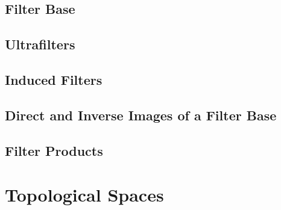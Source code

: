 \subsection{Filter Base}






\subsection{Ultrafilters}


\subsection{Induced Filters}


\subsection{Direct and Inverse Images of a Filter Base}


\subsection{Filter Products}





\section{Topological Spaces}
